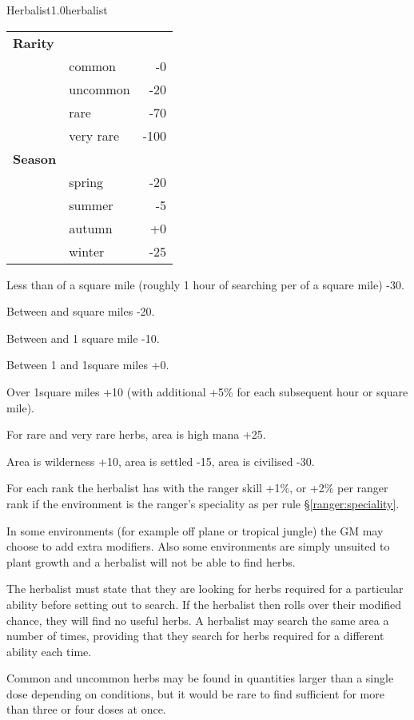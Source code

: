 \begin{skill}{Herbalist}{1.0}{herbalist}
\begin{tabularx}{\linewidth}{lXr}
\textbf{Rarity} & & \\
	& common 		& -0 \\
	& uncommon 		& -20 \\
	& rare			& -70 \\
	& very rare		& -100 \\
\textbf{Season} & & \\
	& spring 		& -20 \\
	& summer	 	& -5 \\
	& autumn		& +0 \\
	& winter		& -25 \\
\end{tabularx}

\begin{Itemize}
\item Less than \fourth of a square mile (roughly 1 hour of searching
per \fourth of a square mile) -30.
\item	Between \fourth and \half square miles -20.
\item	Between \half and 1 square mile -10.
\item	Between 1 and 1\half square miles +0.
\item Over 1\half square miles +10 (with additional +5\% for each
subsequent hour or \fourth square mile).
\item  For rare and very rare herbs, area is high mana +25.
\item Area is wilderness +10, area is settled -15, area is civilised -30.
\item For each rank the herbalist has with the ranger skill +1\%, or
+2\% per ranger rank if the environment is the ranger's speciality as
per rule \S\ref{ranger:speciality}.
\end{Itemize}

In some environments (for example off plane or tropical jungle) the GM
may choose to add extra modifiers.  Also some environments are simply
unsuited to plant growth and a herbalist will not be able to find
herbs.

The herbalist must state that they are looking for herbs required for
a particular ability before setting out to search.  If the herbalist
then rolls over their modified chance, they will find no useful herbs.
A herbalist may search the same area a number of times, providing that
they search for herbs required for a different ability each time.

Common and uncommon herbs may be found in quantities larger than a
single dose depending on conditions, but it would be rare to find
sufficient for more than three or four doses at once.


\end{skill}

